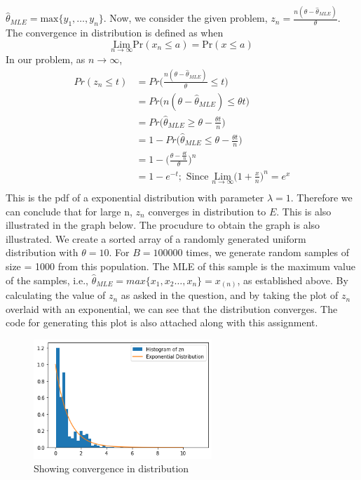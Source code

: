 \documentclass[11pt]{article}
\begin{document}
$\hat{\theta}_{MLE} = \text{max}\{y_{1}, \dots, y_{n}\}$. Now, we consider the given problem, $z_{n} = \frac{n(\theta -  \hat{\theta}_{MLE})}{\theta}$. The convergence in distribution is defined as when
\begin{equation}
  \nonumber
  \underset{n \rightarrow \infty}{\text{Lim}}\text{Pr}(x_{n} \leq a) = \text{Pr}(x \leq a)
\end{equation}
In our problem, as $n \rightarrow \infty$,
\begin{equation}
  \nonumber
  \begin{aligned}
    Pr(z_{n} \leq t) & = Pr\bigg(\frac{n(\theta - \hat{\theta}_{MLE})}{\theta} \leq t\bigg)\\
    & = Pr\bigg(n(\theta - \hat{\theta}_{MLE}) \leq \theta t\bigg)\\
    & = Pr\bigg(\hat{\theta}_{MLE} \geq \theta - \frac{\theta t}{n}\bigg)\\
    & = 1 - Pr\bigg(\hat{\theta}_{MLE} \leq \theta - \frac{\theta t}{n}\bigg)\\
    & = 1 - \bigg(\frac{\theta - \frac{\theta t}{n}}{\theta}\bigg)^{n}\\
    & = 1 - e^{-t}; \text{ Since } \underset{n \rightarrow \infty}{\text{Lim}} \bigg(1 + \frac{x}{n}\bigg)^{n} = e^{x}\\
  \end{aligned}
\end{equation}
This is the pdf of a exponential distribution with parameter $\lambda = 1$. Therefore we can conclude that for large n, $z_{n}$ converges in distribution to $E$. This is also illustrated in the graph below. The procudure to obtain the graph is also illustrated. We create a sorted array of a randomly generated uniform distribution with $\theta = 10$. For $B = 100000$ times, we generate random samples of size = 1000 from this population. The MLE of this sample is the maximum value of the samples, i.e., $\hat{\theta}_{MLE} = max\{x_{1}, x_{2} \dots, x_{n}\} = x_{(n)}$, as established above. By calculating the value of $z_n$ as asked in the question, and by taking the plot of $z_n$ overlaid with an exponential, we can see that the distribution converges. The code for generating this plot is also attached along with this assignment.
\begin{figure}[H]
  \centering
  \includegraphics[width = 0.6\textwidth]{q5.png}
  \caption{Showing convergence in distribution}
\end{figure}
\end{document}
